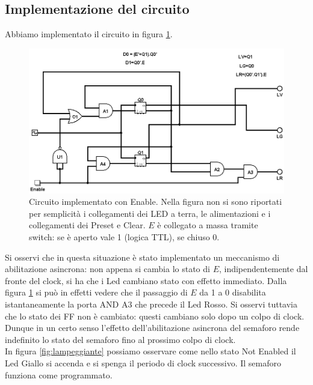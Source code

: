 \documentclass[10pt,a4paper]{article}
\begin{document}
\subsection{Implementazione del circuito}
Abbiamo implementato il circuito in figura \ref{fig:circcomplete}.
\begin{figure}[!htb]
\centering
\includegraphics[scale=0.5]{circcomplete.png}
\caption{Circuito implementato con Enable. Nella figura non si sono riportati per semplicità i collegamenti dei LED a terra, le alimentazioni e i collegamenti dei Preset e Clear. $E$ è collegato a massa tramite switch: se è aperto vale 1 (logica TTL), se chiuso 0.\label{fig:circcomplete}}
\end{figure}
Si osservi che in questa situazione è stato implementato un meccanismo di abilitazione asincrona: non appena si cambia lo stato di $E$, indipendentemente dal fronte del clock, si ha che i Led cambiano stato con effetto immediato. Dalla figura \ref{fig:circcomplete} si può in effetti vedere che il passaggio di $E$ da 1 a 0 disabilita istantaneamente la porta AND A3 che precede il Led Rosso. Si osservi tuttavia che lo stato dei FF non è cambiato: questi cambiano solo dopo un colpo di clock. Dunque in un certo senso l'effetto dell'abilitazione asincrona del semaforo rende indefinito lo stato del semaforo fino al prossimo colpo di clock.\\
In figura \ref{fig:lampeggiante} possiamo osservare come nello stato Not Enabled il Led Giallo si accenda e si spenga il periodo di clock successivo. Il semaforo funziona come programmato.
\end{document}
